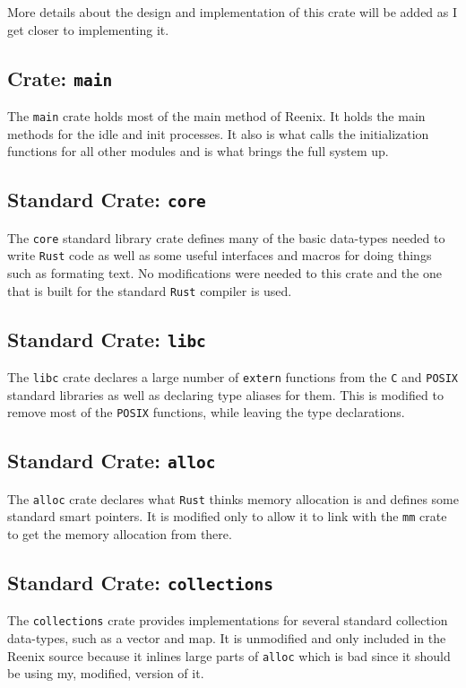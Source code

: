 \documentclass[12pt,letterpaper]{article}
\newcommand{\rust}{\texttt{Rust}}
\begin{document}
More details about the design and implementation of this crate will be
added as I get closer to implementing it.

\subsection{Crate: \texttt{main}}
The \texttt{main} crate holds most of the main method of Reenix. It holds
the main methods for the idle and init processes. It also is what calls
the initialization functions for all other modules and is what brings
the full system up.

\subsection{Standard Crate: \texttt{core}}
The \texttt{core} standard library crate defines many of the basic
data-types needed to write \rust{} code as well as some useful interfaces
and macros for doing things such as formating text. No modifications were
needed to this crate and the one that is built for the standard \rust{}
compiler is used.

\subsection{Standard Crate: \texttt{libc}}
The \texttt{libc} crate declares a large number of \texttt{extern}
functions from the \texttt{C} and \texttt{POSIX} standard libraries as
well as declaring type aliases for them. This is modified to remove most
of the \texttt{POSIX} functions, while leaving the type declarations.

\subsection{Standard Crate: \texttt{alloc}}
The \texttt{alloc} crate declares what \rust{} thinks memory allocation
is and defines some standard smart pointers. It is modified only to
allow it to link with the \texttt{mm} crate to get the memory allocation
from there.

\subsection{Standard Crate: \texttt{collections}}
The \texttt{collections} crate provides implementations for several
standard collection data-types, such as a vector and map.  It is
unmodified and only included in the Reenix source because it inlines
large parts of \texttt{alloc} which is bad since it should be using
my, modified, version of it.
\end{document}
